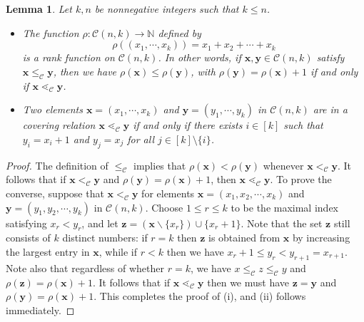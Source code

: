 \documentclass[11pt]{amsart}
\theoremstyle{plain}
\newtheorem{lemma}[theorem]{Lemma}
\theoremstyle{definition}
\theoremstyle{remark}
\numberwithin{equation}{section}
\newcommand{\N}{\mathbb{N}}
\newcommand{\calc}{\mathcal{C}}
\newcommand{\bfz}{\mathbf{z}}
\newcommand{\bfx}{\mathbf{x}}
\newcommand{\bfy}{\mathbf{y}}
\begin{document}
\begin{lemma}\label{lem:cak} 
Let $k,n$ be nonnegative integers such that $k \leq n$. 
\begin{itemize}
\item[{\rm (i)}] 
The function $\rho : \calc(n, k) \rightarrow \N$ defined by 
\[
    \rho( (x_1,\cdots,x_k)) = x_1 + x_2 + \cdots + x_k
\]
is a rank function on $\calc(n,k)$.  In other words, if $\bfx, \bfy \in \calc(n,
k)$ satisfy $\bfx \leq_\calc \bfy$, then we have $\rho(\bfx) \leq \rho(\bfy)$,
with $\rho(\bfy) = \rho(\bfx) + 1$ if and only if $\bfx \lessdot_{\calc} \bfy$.

\item[{\rm (ii)}]
Two elements $\bfx=(x_1,\cdots,x_k)$ and $\bfy=(y_1,\cdots, y_k)$  in $\calc(n,
k)$  are in a covering relation $\bfx\lessdot_\calc \bfy$ if and only if there
exists $i\in [k]$ such that $y_i=x_i+1$ and $y_j=x_j$ for all $j\in
[k]\setminus\{i\}$.
\end{itemize}
\end{lemma}

\begin{proof}
The definition of $\leq_\calc$ implies that  $\rho(\bfx) < \rho(\bfy)$ whenever
$\bfx <_\calc \bfy$. It follows that if $\bfx <_\calc \bfy$ and $\rho(\bfy) =
\rho(\bfx) + 1$, then $\bfx \lessdot_\calc \bfy$.  To prove the converse,
suppose that $\bfx <_\calc \bfy$ for elements $\bfx =(x_1, x_2, \cdots, x_k)$
and $\bfy = (y_1, y_2, \cdots, y_k)$ in $\calc(n,k)$. Choose $1 \leq r \leq k$
to be the maximal index satisfying $x_r < y_r$, and let $\bfz = (\bfx \backslash
\{x_r\}) \cup \{x_r + 1\}$.  Note that the set $\bfz$ still consists of $k$
distinct numbers: if $r = k$ then $\bfz$ is obtained from $\bfx$ by increasing
the largest entry in $\bfx$, while if $r < k$ then we have $x_r + 1 \leq y_r <
y_{r+1}=x_{r+1}$.  Note also that regardless of whether $r = k$, we have $x
\leq_\calc z \leq_\calc y$ and $\rho(\bfz) = \rho(\bfx) + 1$. It follows that if
$\bfx \lessdot_\calc \bfy$ then we must have $\bfz = \bfy$ and $\rho(\bfy) =
\rho(\bfx) + 1$. This completes the proof of (i), and (ii) follows immediately.
\end{proof}
\end{document}
